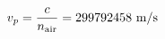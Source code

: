 \documentclass[preview]{standalone}
\begin{document}
\begin{align*}
\special{dvisvgm:raw <g id='unique000'>}v_p = \frac{c}{n_{\text{air}}} = 299792458 \text{ m/s}\special{dvisvgm:raw </g>}
\end{align*}
\end{document}
